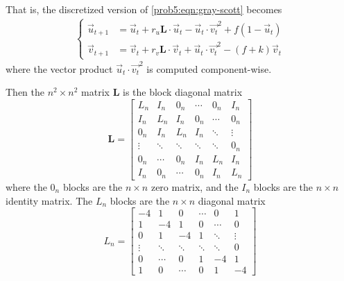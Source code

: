 That is, the discretized version of \autoref{prob5:eqn:gray-scott} becomes
\begin{eqnarray}
    \begin{cases}
        \vec u_{t + 1} & = \vec u_t + r_u \mathbf L \cdot \vec u_t - \vec u_t \cdot \vec {v_t}^2 + f(1 - \vec u_t) \\
        \vec v_{t + 1} & = \vec v_t + r_v \mathbf L \cdot \vec v_t + \vec u_t \cdot \vec {v_t}^2 - (f + k)\vec v_t
    \end{cases}\label{prob5:eqn:discretized-gray-scott}
\end{eqnarray}
where the vector product $\vec u_t \cdot \vec {v_t}^2$ is computed component-wise.

Then the $n ^2 \times n^2$ matrix $\mathbf L$ is the block diagonal matrix
\begin{equation}
    \mathbf L = \begin{bmatrix}
        L_n    & I_n    & 0_n    & \cdots & 0_n    & I_n    \\
        I_n    & L_n    & I_n    & 0_n    & \cdots & 0_n    \\
        0_n    & I_n    & L_n    & I_n    & \ddots & \vdots \\
        \vdots & \ddots & \ddots & \ddots & \ddots & 0_n    \\
        0_n    & \cdots & 0_n    & I_n    & L_n    & I_n    \\
        I_n    & 0_n    & \cdots & 0_n    & I_n    & L_n
    \end{bmatrix}\label{prob5:eqn:laplacian}
\end{equation}
where the $0_n$ blocks are the $n \times n$ zero matrix, and the $I_n$ blocks are the $n \times n$ identity matrix.
The $L_n$ blocks are the $n \times n$ diagonal matrix
\begin{equation}
    L_n = \begin{bmatrix}
        -4     & 1      & 0      & \cdots & 0      & 1      \\
        1      & -4     & 1      & 0      & \cdots & 0      \\
        0      & 1      & -4     & 1      & \ddots & \vdots \\
        \vdots & \ddots & \ddots & \ddots & \ddots & 0      \\
        0      & \cdots & 0      & 1      & -4     & 1      \\
        1      & 0      & \cdots & 0      & 1      & -4
    \end{bmatrix}\label{prob5:eqn:laplacian-L-block}
\end{equation}

